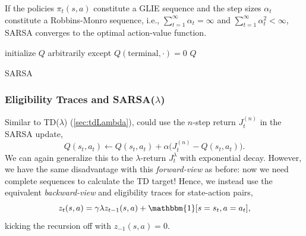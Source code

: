 			\begin{theorem}
				If the policies \( \pi_t(s, a) \) constitute a \ac{GLIE} sequence and the step sizes \(\alpha_t\) constitute a Robbins-Monro sequence, i.e., \( \sum_{t = 1}^{\infty} \alpha_t = \infty \) and \( \sum_{t = 1}^{\infty} \alpha_t^2 < \infty \), \ac{SARSA} converges to the optimal action-value function.
			\end{theorem}

			\begin{algorithm}  \DontPrintSemicolon
				initialize \(Q\) arbitrarily except \(Q(\mathrm{terminal}, \cdot) = 0\) \;
				\Return \(Q\) \;
				\caption{\acs{SARSA}}
				\label{alg:sarsa}
			\end{algorithm}

			\subsubsection{Eligibility Traces and \acs{SARSA}(\(\lambda\))}
				Similar to \acs{TD}(\(\lambda\)) (\autoref{sec:tdLambda}), could use the \(n\)-step return \(J_t^{(n)}\) in the \ac{SARSA} update,
				\begin{equation}
					Q(s_t, a_t) \gets Q(s_t, a_t) + \alpha \bigl( J_t^{(n)} - Q(s_t, a_t) \bigr).
				\end{equation}
				We can again generalize this to the \(\lambda\)-return \(J_t^\lambda\) with exponential decay. However, we have the same disadvantage with this \emph{forward-view} as before: now we need complete sequences to calculate the TD target! Hence, we instead use the equivalent \emph{backward-view} and eligibility traces for state-action pairs,
				\begin{equation}
					z_t(s, a) = \gamma \lambda z_{t - 1}(s, a) + \mathbbm{1}[s = s_t, a = a_t],
				\end{equation}
				kicking the recursion off with \( z_{-1}(s, a) = 0 \).

